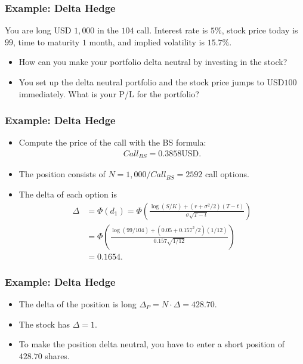 \begin{frame}[fragile]
\frametitle{Example: Delta Hedge}
You are long USD $1,000$ in the $104$ call. Interest rate is $5\%$,
stock price today is $99$, time to maturity $1$ month, and implied volatility is
$15.7\%$.
\begin{itemize}
  \item How can you make your portfolio delta neutral by investing in the stock?
  \item You set up the delta neutral portfolio and the stock price jumps to
  USD$100$ immediately. What is your P/L for the portfolio?
\end{itemize}

\end{frame}

\begin{frame}[fragile]
\frametitle{Example: Delta Hedge}
\begin{itemize}
  \item Compute the price of the call with the BS formula:
  \begin{align*}
    Call_{BS} = 0.3858 \text{USD}.
  \end{align*}
  \item The position consists of $N=1,000/Call_{BS}=2592$ call options.
  \item The delta of each option is
  \begin{align*}
    \Delta &= \Phi(d_1) =\Phi\left(\frac{\log \left( S/K \right) + (r+\sigma^2/2)(T-t)
    }{\sigma\sqrt{T-t}}\right) \\
    	&= \Phi\left(\frac{\log \left( 99/104 \right) + (0.05+0.157^2/2)(1/12)
    }{0.157\sqrt{1/12}}\right)\\
     	&= 0.1654.
  \end{align*}
\end{itemize}
\end{frame}


\begin{frame}[fragile]
\frametitle{Example: Delta Hedge}
\begin{itemize}
  \item The delta of the position is long $\Delta_P=N\cdot \Delta=428.70$.
  \item The stock has $\Delta=1$.
  \item To make the position delta neutral, you have to enter a short position
  of $428.70$ shares.
\end{itemize}
\end{frame}

